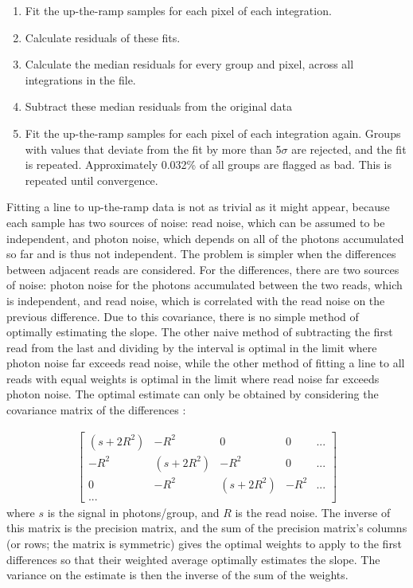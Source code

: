 \documentclass[pdflatex,sn-standardnature]{sn-jnl}%
\begin{document}
\begin{enumerate}
    \item Fit the up-the-ramp samples for each pixel of each integration.
    \item Calculate residuals of these fits.
    \item Calculate the median residuals for every group and pixel, across all integrations in the file.
    \item Subtract these median residuals from the original data
    \item Fit the up-the-ramp samples for each pixel of each integration again.  Groups with values that deviate from the fit by more than 5$\sigma$ are rejected, and the fit is repeated.  Approximately 0.032\% of all groups are flagged as bad.  This is repeated until convergence.
\end{enumerate}

Fitting a line to up-the-ramp data is not as trivial as it might appear, because each sample has two sources of noise: read noise, which can be assumed to be independent, and photon noise, which depends on all of the photons accumulated so far and is thus not independent.  The problem is simpler when the differences between adjacent reads are considered.  For the differences, there are two sources of noise: photon noise for the photons accumulated between the two reads, which is independent, and read noise, which is correlated with the read noise on the previous difference.  Due to this covariance, there is no simple method of optimally estimating the slope.  The other naive method of subtracting the first read from the last and dividing by the interval is optimal in the limit where photon noise far exceeds read noise, while the other method of fitting a line to all reads with equal weights is optimal in the limit where read noise far exceeds photon noise.  The optimal estimate can only be obtained by considering the covariance matrix of the differences \citep{fixsen_2000}:

\begin{align}
\begin{bmatrix}
(s + 2R^2) & -R^2 & 0 & 0 & ...\\
-R^2 & (s + 2R^2) & -R^2 & 0 & ...\\ 
0 & -R^2 & (s + 2R^2) & -R^2 & ...\\
...
\end{bmatrix}
\end{align}
where $s$ is the signal in photons/group, and $R$ is the read noise.  The inverse of this matrix is the precision matrix, and the sum of the precision matrix's columns (or rows; the matrix is symmetric) gives the optimal weights to apply to the first differences so that their weighted average optimally estimates the slope.  The variance on the estimate is then the inverse of the sum of the weights.
\end{document}
